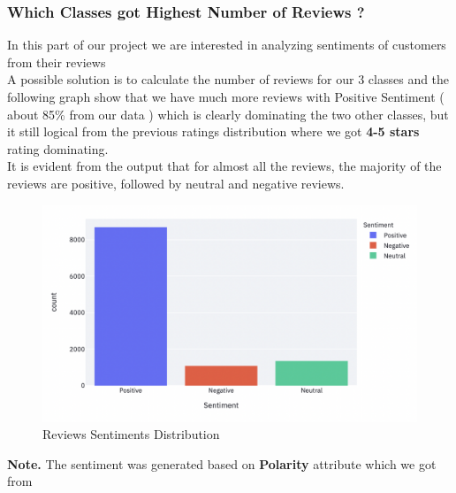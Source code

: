 \documentclass{article}
\begin{document}
\subsubsection{ Which Classes got Highest Number of Reviews ? }
In this part of our project we are interested in analyzing sentiments of customers from their reviews\\
A possible solution is to calculate the number of reviews for our 3 classes and the following graph show that we have much more reviews with Positive Sentiment ( about 85\% from our data ) which is clearly dominating the two other classes, but it still logical from the previous ratings distribution where we got \textbf{4-5 stars} rating dominating.\\It is evident from the output that for almost all the reviews, the majority of the reviews are positive, followed by neutral and negative reviews.
\begin{figure}[H]
    \centering
    \includegraphics[scale=0.55]{src/img/classes.png}
    \caption{Reviews Sentiments Distribution}
    \label{fig:my_label}
\end{figure}
\textbf{Note.} The sentiment was generated based on \textbf{Polarity} attribute which we got from 
\end{document}
